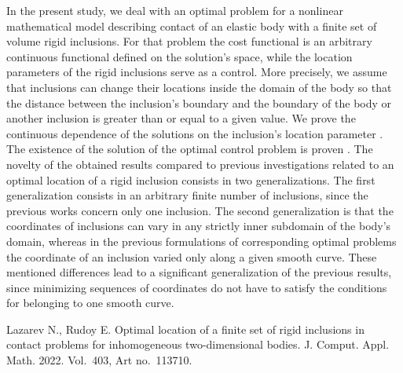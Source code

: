 \documentclass[12pt]{llncs}
\begin{document}
In the present study, we deal with an optimal problem for a
nonlinear mathematical model describing contact of an elastic body
with a finite set of volume rigid inclusions. For that problem the
cost functional is an arbitrary continuous functional defined on
the solution's space, while the location parameters of the rigid
inclusions serve as a control. More precisely, we assume that
inclusions can change their locations inside the domain of the
body so that the distance between the inclusion's boundary and the
boundary of the body or another inclusion is greater than or equal
to a given value. We prove the continuous dependence of the
solutions on the inclusion's location parameter
\cite{Laz-Rud2022}. The existence of the solution of the optimal
control problem is proven \cite{Laz-Rud2022}. The novelty of the
obtained results compared to previous investigations related to an
optimal location of a rigid inclusion consists in two
generalizations. The first generalization consists in an arbitrary
finite number of inclusions, since the previous works concern only
one inclusion. The second generalization is that the coordinates
of inclusions can vary in any strictly inner subdomain of the
body's domain, whereas in the previous formulations of
corresponding optimal problems the coordinate of an inclusion
varied only along a given smooth curve. These mentioned
differences lead to a significant generalization of the previous
results, since minimizing sequences of coordinates do not have to
satisfy the conditions for belonging to one smooth curve.

%


\begin{thebibliography}{9} %
 Lazarev N., Rudoy E. Optimal location of a finite set of rigid inclusions in contact problems for inhomogeneous two-dimensional bodies.
J. Comput. Appl. Math. 2022. Vol.~403, Art no.~113710.


\end{thebibliography}

\end{document}
